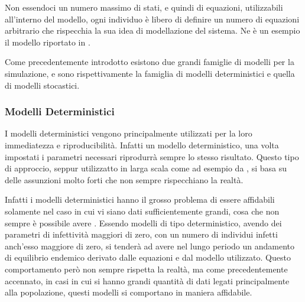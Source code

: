 Non essendoci un numero massimo di stati, e quindi di equazioni, utilizzabili
all'interno del modello, ogni individuo è libero di definire un numero
di equazioni arbitrario che rispecchia la sua idea di modellazione del 
sistema. Ne è un esempio il modello riportato in \cite{Giordano2020}.

Come precedentemente introdotto esistono due grandi famiglie di modelli
per la simulazione, e sono rispettivamente la famiglia di modelli deterministici
e quella di modelli stocastici.

\subsubsection{Modelli Deterministici}
I modelli deterministici vengono principalmente utilizzati 
per la loro immediatezza e riproducibilità. Infatti un modello
deterministico, una volta impostati i parametri necessari
riprodurrà sempre lo stesso risultato. Questo tipo di approccio, 
seppur utilizzatto in larga scala come ad esempio da \cite{Bjornstad2020}
\cite{Mwalili2020}, \cite{Giordano2020} si basa su delle assunzioni molto forti
che non sempre rispecchiano la realtà. 

Infatti i modelli deterministici hanno il grosso problema di
essere affidabili solamente nel caso in cui vi siano dati 
sufficientemente grandi, cosa che non sempre è possibile
avere \cite{wiki:Compartmental_models_in_epidemiology}.
Essendo modelli di tipo deterministico, avendo dei parametri 
di infettività maggiori di zero, con un numero di individui infetti
anch'esso maggiore di zero, si tenderà ad avere nel lungo
periodo un andamento di equilibrio endemico derivato 
dalle equazioni e dal modello utilizzato. Questo comportamento
però non sempre rispetta la realtà, ma come precedentemente 
accennato, in casi in cui si hanno grandi quantità di dati 
legati principalmente alla popolazione, questi modelli si 
comportano in maniera affidabile.

